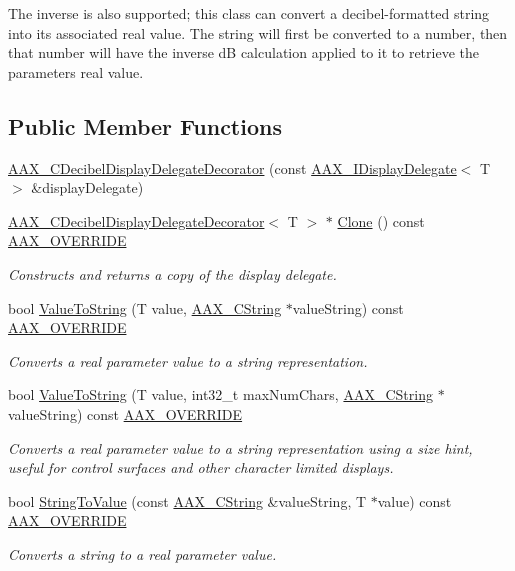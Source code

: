 The inverse is also supported; this class can convert a decibel-\/formatted string into its associated real value. The string will first be converted to a number, then that number will have the inverse dB calculation applied to it to retrieve the parameter\textquotesingle{}s real value. \subsection*{Public Member Functions}
\begin{DoxyCompactItemize}
\item 
\mbox{\hyperlink{a01469_aac7fbdbd0ce453aac8fa78cc4d1cef19}{A\+A\+X\+\_\+\+C\+Decibel\+Display\+Delegate\+Decorator}} (const \mbox{\hyperlink{a01801}{A\+A\+X\+\_\+\+I\+Display\+Delegate}}$<$ T $>$ \&display\+Delegate)
\item 
\mbox{\hyperlink{a01469}{A\+A\+X\+\_\+\+C\+Decibel\+Display\+Delegate\+Decorator}}$<$ T $>$ $\ast$ \mbox{\hyperlink{a01469_a2abd5f4d5a8d6db7db73fadfe8a2aa04}{Clone}} () const \mbox{\hyperlink{a00392_ac2f24a5172689ae684344abdcce55463}{A\+A\+X\+\_\+\+O\+V\+E\+R\+R\+I\+DE}}
\begin{DoxyCompactList}\small\item\em Constructs and returns a copy of the display delegate. \end{DoxyCompactList}\item 
bool \mbox{\hyperlink{a01469_a147cb1d0b62b0a62c6e3bb98daf80027}{Value\+To\+String}} (T value, \mbox{\hyperlink{a01573}{A\+A\+X\+\_\+\+C\+String}} $\ast$value\+String) const \mbox{\hyperlink{a00392_ac2f24a5172689ae684344abdcce55463}{A\+A\+X\+\_\+\+O\+V\+E\+R\+R\+I\+DE}}
\begin{DoxyCompactList}\small\item\em Converts a real parameter value to a string representation. \end{DoxyCompactList}\item 
bool \mbox{\hyperlink{a01469_ab301958be3d376757bf1bb88ded1c911}{Value\+To\+String}} (T value, int32\+\_\+t max\+Num\+Chars, \mbox{\hyperlink{a01573}{A\+A\+X\+\_\+\+C\+String}} $\ast$value\+String) const \mbox{\hyperlink{a00392_ac2f24a5172689ae684344abdcce55463}{A\+A\+X\+\_\+\+O\+V\+E\+R\+R\+I\+DE}}
\begin{DoxyCompactList}\small\item\em Converts a real parameter value to a string representation using a size hint, useful for control surfaces and other character limited displays. \end{DoxyCompactList}\item 
bool \mbox{\hyperlink{a01469_a7f4645d7e464d63ef22e93c4a99f3f09}{String\+To\+Value}} (const \mbox{\hyperlink{a01573}{A\+A\+X\+\_\+\+C\+String}} \&value\+String, T $\ast$value) const \mbox{\hyperlink{a00392_ac2f24a5172689ae684344abdcce55463}{A\+A\+X\+\_\+\+O\+V\+E\+R\+R\+I\+DE}}
\begin{DoxyCompactList}\small\item\em Converts a string to a real parameter value. \end{DoxyCompactList}\end{DoxyCompactItemize}


